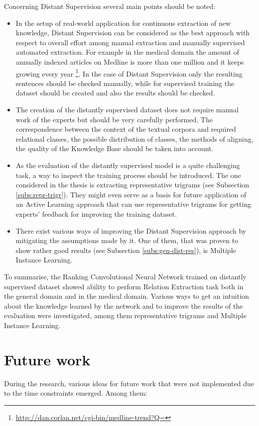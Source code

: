 Concerning Distant Supervision several main points should be noted:
\begin{itemize}
\item In the setup of real-world application for continuous extraction of new knowledge, Distant Supervision
can be considered as the best approach with respect to overall effort among manual extraction and manually supervised automated 
extraction. For example in the medical domain the amount of annually indexed articles on Medline is 
more than one million and it keeps growing every year \footnote{\url{http://dan.corlan.net/cgi-bin/medline-trend?Q=}}.
In the case of Distant Supervision only the resulting sentences should be checked manually, while 
for supervised training the dataset should be created and also the results should be checked.
\item The creation of the distantly supervised dataset does not require manual work of the experts 
but should be very carefully performed. The correspondence between the context of the textual corpora and 
required relational classes, the possible distribution of classes, the methods of aligning, the quality of 
the Knowledge Base should be taken into account.
\item As the evaluation of the distantly supervised model is a quite challenging task, a way to inspect 
the training process should be introduced. The one considered in the thesis is extracting representative 
trigrams (see Subsection \ref{subs:repr-trigr}). They might even serve as a basis for future application of an Active Learning approach that 
can use representative trigrams for getting experts' feedback for improving the training dataset.
\item There exist various ways of improving the Distant Supervision approach by mitigating the assumptions 
made by it. One of them, that was proven to show rather good results (see Subsection \ref{subs:gen-dist-res}), is Multiple Instance Learning.
\end{itemize}

To summarise, the Ranking Convolutional Neural Network trained on distantly supervised dataset 
showed ability to perform Relation Extraction task both in the general domain and in the medical domain.
Various ways to get an intuition about the knowledge learned by the network and to improve the 
results of the evaluation were investigated, among them representative trigrams and Multiple Instance Learning.

\section{Future work}
During the research, various ideas for future work that were not implemented due
to the time constraints emerged. Among them:

